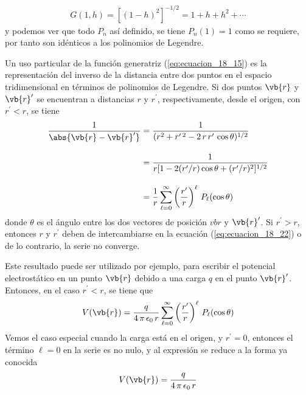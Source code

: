 \begin{align*}
G(1,h) = [(1 - h)^{2}]^{-1/2} =  1 + h + h^{2} + \cdots
\end{align*}
y podemos ver que todo $P_{n}$ así definido, se tiene $P_{n} (1) = 1$ como se requiere, por tanto son idénticos a los polinomios de Legendre.
\par
Un uso particular de la función generatriz (\ref{eq:ecuacion_18_15}) es la representación del inverso de la distancia entre dos puntos en el espacio tridimensional en términos de polinomios de Legendre. Si dos puntos $\vb{r}$ y $\vb{r}^{\prime}$ se encuentran a distancias $r$ y $r^{\prime}$, respectivamente, desde el origen, con $r^{\prime} < r$, se tiene
\begin{eqnarray}
\dfrac{1}{\abs{\vb{r} - \vb{r}^{\prime}}} &= \dfrac{1}{(r^{2} + r^{\prime \: 2} - 2 \, r \, r^{\prime} \, \cos \theta)^{1/2}} \nonumber \\[1em]
&= \dfrac{1}{r [ 1 - 2 (r^{\prime}/r) \cos \theta + (r^{\prime}/r)^{2}]^{1/2}} \nonumber \\[1em]
&= \dfrac{1}{r} \sum_{\ell = 0}^{\infty} \left( \dfrac{r^{\prime}}{r} \right)^{\ell} \, P_{\ell} (\cos \theta)
\label{eq:ecuacion_18_22}
\end{eqnarray}
donde $\theta$ es el ángulo entre los dos vectores de posición $vb{r}$ y $\vb{r}^{\prime}$. Si $r^{\prime} > r$, entonces $r$ y $r^{\prime}$ deben de intercambiarse en la ecuación (\ref{eq:ecuacion_18_22}) o de lo contrario, la serie no converge.
\par
Este resultado puede ser utilizado por ejemplo, para escribir el potencial electrostático en un punto $\vb{r}$ debido a una carga $q$ en el punto $\vb{r}^{\prime}$. Entonces, en el caso $r^{\prime} < r$, se tiene que
\begin{align*}
V(\vb{r}) =  \dfrac{q}{4 \, \pi \, \epsilon_{0} \, r} \sum_{\ell = 0}^{\infty} \left( \dfrac{r^{\prime}}{r} \right)^{\ell} \, P_{\ell} (\cos \theta)
\end{align*}
Vemos el caso especial cuando la carga está en el origen, y $r^{\prime} =0$, entonces el término $\ell =0$ en la serie es no nulo, y al expresión se reduce a la forma ya conocida 
\begin{align*}
V(\vb{r}) = \frac{q}{4 \, \pi \, \epsilon_{0} \, r}
\end{align*}
